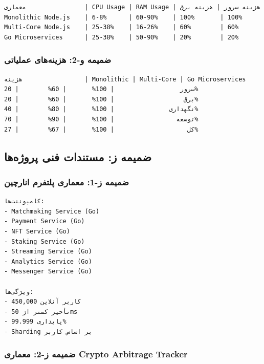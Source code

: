 \documentclass[
]{article}
\begin{document}
\begin{verbatim}
معماری                | CPU Usage | RAM Usage | هزینه سرور | هزینه برق
Monolithic Node.js    | 6-8%      | 60-90%    | 100%       | 100%
Multi-Core Node.js    | 25-38%    | 16-26%    | 60%        | 60%
Go Microservices      | 25-38%    | 50-90%    | 20%        | 20%
\end{verbatim}

\subsubsection{ضمیمه و-2: هزینه‌های
عملیاتی}\label{ux636ux645ux6ccux645ux647-ux648-2-ux647ux632ux6ccux646ux647ux647ux627ux6cc-ux639ux645ux644ux6ccux627ux62aux6cc}

\begin{verbatim}
هزینه                 | Monolithic | Multi-Core | Go Microservices
سرور                  | 100%       | 60%        | 20%
برق                   | 100%       | 60%        | 20%
نگهداری               | 100%       | 80%        | 40%
توسعه                 | 100%       | 90%        | 70%
کل                    | 100%       | 67%        | 27%
\end{verbatim}

\subsection{ضمیمه ز: مستندات فنی
پروژه‌ها}\label{ux636ux645ux6ccux645ux647-ux632-ux645ux633ux62aux646ux62fux627ux62a-ux641ux646ux6cc-ux67eux631ux648ux698ux647ux647ux627}

\subsubsection{ضمیمه ز-1: معماری پلتفرم
انارچین}\label{ux636ux645ux6ccux645ux647-ux632-1-ux645ux639ux645ux627ux631ux6cc-ux67eux644ux62aux641ux631ux645-ux627ux646ux627ux631ux686ux6ccux646}

\begin{verbatim}
کامپوننت‌ها:
- Matchmaking Service (Go)
- Payment Service (Go)
- NFT Service (Go)
- Staking Service (Go)
- Streaming Service (Go)
- Analytics Service (Go)
- Messenger Service (Go)

ویژگی‌ها:
- 450,000 کاربر آنلاین
- تأخیر کمتر از 50ms
- پایداری 99.999%
- Sharding بر اساس کاربر
\end{verbatim}

\subsubsection{ضمیمه ز-2: معماری Crypto Arbitrage
Tracker}\label{ux636ux645ux6ccux645ux647-ux632-2-ux645ux639ux645ux627ux631ux6cc-crypto-arbitrage-tracker}
\end{document}
